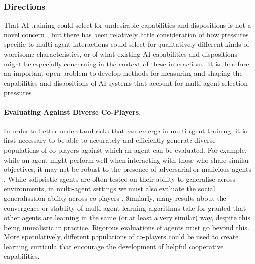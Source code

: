     



\subsubsection{Directions}

That AI training could select for undesirable capabilities and dispositions is not a novel concern \citep{Bostrom2014,Ngo2022,Omohundro2008}, but there has been relatively little consideration of how pressures specific to multi-agent interactions could select for qualitatively different kinds of worrisome characteristics, or of what existing AI capabilities and dispositions might be especially concerning in the context of these interactions.
It is therefore an important open problem to develop methods for measuring and shaping the capabilities and dispositions of AI systems that account for multi-agent selection pressures.


\paragraph{Evaluating Against Diverse Co-Players.}
In order to better understand risks that can emerge in multi-agent training, it is first necessary to be able to accurately and efficiently {generate diverse populations of co-players} against which an agent can be evaluated.
For example, while an agent might perform well when interacting with those who share similar objectives, it may not be robust to the presence of adversarial or malicious agents \citep{Barbi2025,Huang2024,Gleave2020}.
While solipsistic agents are often tested on their ability to generalise across environments, in multi-agent settings we must also evaluate the social generalisation ability across co-players \citep{Leibo2021-cf,Agapiou2022-an,Stone2010}.
Similarly, many results about the convergence or stability of multi-agent learning algorithms take for granted that other agents are learning in the same (or at least a very similar) way, despite this being unrealistic in practice.
Rigorous evaluations of agents must go beyond this.
More speculatively, different populations of co-players could be used to create learning curricula that encourage the development of helpful cooperative capabilities. 

